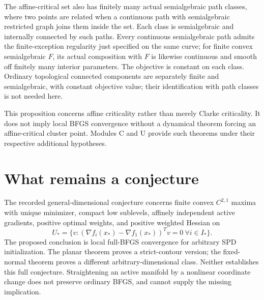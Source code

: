 The affine-critical set also has finitely many actual semialgebraic path classes, where two points are related when a continuous path with semialgebraic restricted graph joins them inside the set. Each class is semialgebraic and internally connected by such paths. Every continuous semialgebraic path admits the finite-exception regularity just specified on the same curve; for finite convex semialgebraic $F$, its actual composition with $F$ is likewise continuous and smooth off finitely many interior parameters. The objective is constant on each class. Ordinary topological connected components are separately finite and semialgebraic, with constant objective value; their identification with path classes is not needed here.

This proposition concerns affine criticality rather than merely Clarke criticality. It does not imply local BFGS convergence without a dynamical theorem forcing an affine-critical cluster point. Modules C and U provide such theorems under their respective additional hypotheses.

\section{What remains a conjecture}
The recorded general-dimensional conjecture concerns finite convex $C^{2,1}$ maxima with unique minimizer, compact low sublevels, affinely independent active gradients, positive optimal weights, and positive weighted Hessian on
\[
 U_* =\{v:(\nabla f_i(x_*)-\nabla f_1(x_*))^Tv=0\ \forall i\in I_*\}.
\]
The proposed conclusion is local full-BFGS convergence for arbitrary SPD initialization. The planar theorem proves a strict-contour version; the fixed-normal theorem proves a different arbitrary-dimensional class. Neither establishes this full conjecture. Straightening an active manifold by a nonlinear coordinate change does not preserve ordinary BFGS, and cannot supply the missing implication.
